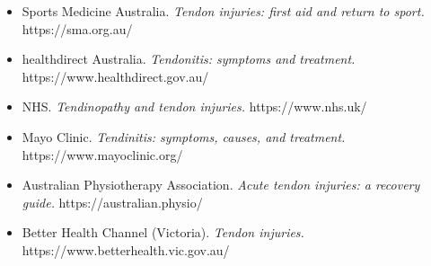 \begin{itemize}
    \item Sports Medicine Australia. \textit{Tendon injuries: first aid and return to sport.} https://sma.org.au/
    \item healthdirect Australia. \textit{Tendonitis: symptoms and treatment.} https://www.healthdirect.gov.au/
    \item NHS. \textit{Tendinopathy and tendon injuries.} https://www.nhs.uk/
    \item Mayo Clinic. \textit{Tendinitis: symptoms, causes, and treatment.} https://www.mayoclinic.org/
    \item Australian Physiotherapy Association. \textit{Acute tendon injuries: a recovery guide.} https://australian.physio/
    \item Better Health Channel (Victoria). \textit{Tendon injuries.} https://www.betterhealth.vic.gov.au/
\end{itemize}

\clearpage
